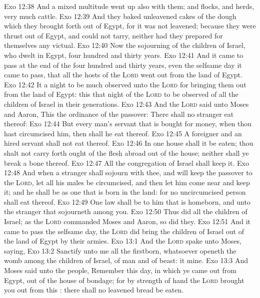 \vs Exo 12:38 And a mixed multitude went up also with them; and flocks, and herds,  very much cattle.
\vs Exo 12:39 And they baked unleavened cakes of the dough which they brought forth out of Egypt, for it was not leavened; because they were thrust out of Egypt, and could not tarry, neither had they prepared for themselves any victual.
\vs Exo 12:40 Now the sojourning of the children of Israel, who dwelt in Egypt,  four hundred and thirty years.
\vs Exo 12:41 And it came to pass at the end of the four hundred and thirty years, even the selfsame day it came to pass, that all the hosts of the \textsc{Lord} went out from the land of Egypt.
\vs Exo 12:42 It  a night to be much observed unto the \textsc{Lord} for bringing them out from the land of Egypt: this  that night of the \textsc{Lord} to be observed of all the children of Israel in their generations.
\vs Exo 12:43 And the \textsc{Lord} said unto Moses and Aaron, This  the ordinance of the passover: There shall no stranger eat thereof:
\vs Exo 12:44 But every man's servant that is bought for money, when thou hast circumcised him, then shall he eat thereof.
\vs Exo 12:45 A foreigner and an hired servant shall not eat thereof.
\vs Exo 12:46 In one house shall it be eaten; thou shalt not carry forth ought of the flesh abroad out of the house; neither shall ye break a bone thereof.
\vs Exo 12:47 All the congregation of Israel shall keep it.
\vs Exo 12:48 And when a stranger shall sojourn with thee, and will keep the passover to the \textsc{Lord}, let all his males be circumcised, and then let him come near and keep it; and he shall be as one that is born in the land: for no uncircumcised person shall eat thereof.
\vs Exo 12:49 One law shall be to him that is homeborn, and unto the stranger that sojourneth among you.
\vs Exo 12:50 Thus did all the children of Israel; as the \textsc{Lord} commanded Moses and Aaron, so did they.
\vs Exo 12:51 And it came to pass the selfsame day,  the \textsc{Lord} did bring the children of Israel out of the land of Egypt by their armies.
\vs Exo 13:1 And the \textsc{Lord} spake unto Moses, saying,
\vs Exo 13:2 Sanctify unto me all the firstborn, whatsoever openeth the womb among the children of Israel,  of man and of beast: it  mine.
\vs Exo 13:3 And Moses said unto the people, Remember this day, in which ye came out from Egypt, out of the house of bondage; for by strength of hand the \textsc{Lord} brought you out from this : there shall no leavened bread be eaten.
